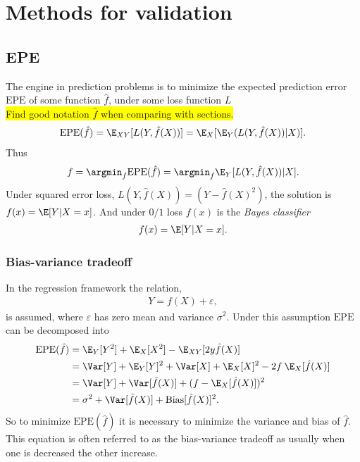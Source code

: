 \chapter{Methods for validation}
\label{chap:Metods for validation}
\section{EPE}
\label{sec:EPE}
The engine in prediction problems is to minimize the expected prediction error $\mathrm{EPE}$ of some function $\hat f$, under some loss function $L$
\\\colorbox{yellow}{Find good notation $\hat f$ when comparing with sections.}
\begin{align}
  \mathrm{EPE}(\hat f) = \E_{X Y}[L(Y, \hat f(X))] = \E_X [\E_Y (L(Y, \hat f(X))|X)].
\end{align}
Thus 
\begin{align}
  f = \argmin_{\hat f} \mathrm{EPE}(\hat f) = \argmin_{\hat f} \E_Y [L(Y, \hat f(X)) | X ].
\end{align}
Under squared error loss, $L(Y, \hat f(X)) = (Y- \hat f(X)^2)$, the solution is 
$ f(x) = \E[Y | X=x]$. And under $0/1$ loss $ f(x)$ is the \textit{Bayes classifier} 
\begin{align}
  f(x) = \E[Y | X=x].
\end{align}

\subsection{Bias-variance tradeoff}
\label{sub:Bias-variance tradeoff}
In the regression framework the relation,
\begin{align}
  Y = f(X) + \varepsilon,  
\end{align}
is assumed, where $\varepsilon$ has zero mean and variance $\sigma^2$.
Under this assumption $\mathrm{EPE}$ can be decomposed into
\begin{align}
  \mathrm{EPE}(\hat f) &=  \E_Y[Y^2] + \E_X[X^2] - \E_{X Y}[2 y \hat f(X)] \notag \\
                       &= \Var[Y] + \E_Y[Y]^2 + \Var[X] + \E_X[X]^2 - 2 f\: \E_X[\hat f(X)] \notag \\
                       &= \Var[Y] + \Var[\hat f(X)] + (f - \E_X[\hat f(X)])^2 \notag \\
                       &= \sigma^2 + \Var[\hat f(X)] + \mathrm{Bias}[\hat f(X)]^2.
\end{align}
So to minimize $\mathrm{EPE}(\hat f)$ it is necessary to minimize the variance and bias of $\hat f$. This equation is often referred to as the bias-variance tradeoff as usually when one is decreased the other increase. 

